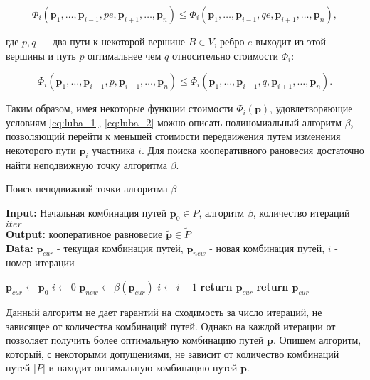 \documentclass[12pt, a4paper]{article}
\begin{document}
\begin{equation}
	\label{eq:luba_1}
	\Phi_i (\textbf{p}_1, \ldots, \textbf{p}_{i - 1}, pe, \textbf{p}_{i + 1}, \ldots, \textbf{p}_n) \le 
	\Phi_i (\textbf{p}_1, \ldots, \textbf{p}_{i - 1}, qe, \textbf{p}_{i + 1}, \ldots, \textbf{p}_n),
\end{equation}

где $p, q$ --- два пути к некоторой вершине $B \in V$, ребро $e$ выходит из этой вершины и путь $p$ оптимальнее чем $q$ относительно стоимости $\Phi_i$:

\begin{equation}
	\label{eq:luba_2}
	\Phi_i (\textbf{p}_1, \ldots, \textbf{p}_{i - 1}, p, \textbf{p}_{i + 1}, \ldots, \textbf{p}_n) \le
  	\Phi_i (\textbf{p}_1, \ldots, \textbf{p}_{i - 1}, q, \textbf{p}_{i + 1}, \ldots, \textbf{p}_n).
\end{equation}

Таким образом, имея некоторые функции стоимости $\Phi_i (\textbf{p})$, удовлетворяющие условиям \eqref{eq:luba_1}, \eqref{eq:luba_2} можно описать полиномиальный алгоритм $\beta$, позволяющий перейти к меньшей стоимости передвижения путем изменения некоторого пути  $\textbf{p}_i$ участника $i$. Для поиска кооперативного рановесия достаточно найти неподвижную точку алгоритма $\beta$. 

\begin{algorithm}[!hpt]
	\caption{Поиск неподвижной точки алгоритма $\beta$}
	\label{alg:coop_find1}
	{\bf {Input:}} Начальная комбинация путей $\textbf{p}_0 \in P$, алгоритм $\beta$, количество итераций $iter$\\
	{\bf {Output:}} кооперативное равновесие $\widetilde{\textbf{p}} \in \widetilde{P}$\\
	{\bf {Data:}} $\textbf{p}_{cur}$ - текущая комбинация путей, $\textbf{p}_{new}$ - новая комбинация путей, $i$ - номер итерации
	\begin{algorithmic}[1]
		\State $\textbf{p}_{cur} \gets \textbf{p}_0$
		\State $i \gets 0$
		\State $\textbf{p}_{new} \gets \beta (\textbf{p}_{cur}) $
		\State $i \gets i + 1$
			\State \textbf{return $\textbf{p}_{cur}$}
		\EndIf
		\EndWhile
	\State \textbf{return $\textbf{p}_{cur}$}
	\end{algorithmic}
\end{algorithm}

Данный алгоритм не дает гарантий на сходимость за число итераций, не зависящее от количества комбинаций путей. Однако на каждой итерации от позволяет получить более оптимальную комбинацию путей $\textbf{p}$. Опишем алгоритм, который, с некоторыми допущениями, не зависит от количество комбинаций путей $|P|$ и находит оптимальную комбинацию путей $\textbf{p}$.
\end{document}
